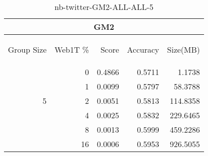 \begin{center}
\begin{table}[htbp] 
 \begin{center}
\begin{tabular}{ | r | r | r | r | r |}
\hline
\multicolumn{5}{|c|}{GM2}\\
\hline
\begin{sideways}Group Size\end{sideways} & \begin{sideways}Web1T \%\end{sideways} & \begin{sideways}Score\end{sideways} & \begin{sideways}Accuracy\end{sideways} & \begin{sideways}Size(MB)\end{sideways}\\
\hline
\multirow{5}{*}{5}
 & 0 & 0.4866 & 0.5711 & 1.1738\\ \cline{2-5}
 & 1 & 0.0099 & 0.5797 & 58.3788\\ \cline{2-5}
 & 2 & 0.0051 & 0.5813 & 114.8358\\ \cline{2-5}
 & 4 & 0.0025 & 0.5832 & 229.6465\\ \cline{2-5}
 & 8 & 0.0013 & 0.5999 & 459.2286\\ \cline{2-5}
 & 16 & 0.0006 & 0.5953 & 926.5055\\ \cline{2-5}
\hline
\end{tabular}
\caption{nb-twitter-GM2-ALL-ALL-5}
\label{table:nb-twitter-GM2-ALL-ALL-5}
\end{center}
 \end{table}
\end{center}


